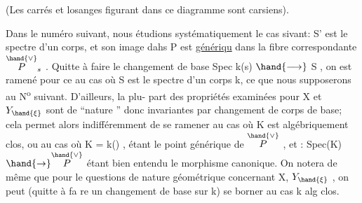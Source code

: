 (Les carrés et losanges figurant dans ce diagramme sont carsiens).

Dans le numéro suivant, nous étudions systématiquement le cas
sivant: S' est le spectre d'un corps, et son image dahs P est \uline{génériqu}
dans la fibre correspondante $\overset{\hand{\vee}}{P}_s$ . Quitte à faire le changement de base
Spec k(s) $\hand{\longrightarrow}$ S , on est ramené pour ce au cas où S est le spectre
d'un corps k, ce que nous supposerons au N\textsuperscript{o} suivant. D'ailleurs, la plu-%
part des propriétés examinées pour X et $Y_{\hand{\xi}}$ sont de ``nature ''
donc invariantes par changement de corps de base; cela permet alors
indifféremment de se ramener au cas où K est algébriquement clos, ou au
cas où K = k(\hand{$\eta$}) , \hand{$\eta$} étant le point générique de $\overset{\hand{\vee}}{P}$ , et \hand{$\xi$} : Spec(K)$\hand{\to}\overset{\hand{\vee}}{P}$
étant bien entendu le morphisme canonique. On notera de même que pour le
questions de nature géométrique concernant X, $Y_{\hand{\xi}}$ , on peut (quitte à fa
re un changement de base sur k) se borner au cas k alg clos.

